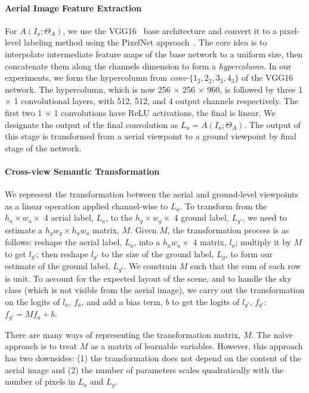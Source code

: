 \paragraph{Aerial Image Feature Extraction} For $A(I_a;\Theta_A)$, we
use the VGG16~\cite{simonyan2014very} base architecture and convert it to a 
pixel-level labeling method using the PixelNet approach~\cite{BansalChen16}.  
The core idea is to interpolate intermediate feature maps of the base
network to a uniform size, then concatenate them along the channels dimension 
to form a {\em hypercolumn}.  In our experiments, we form the hypercolumn from 
{\em conv-$\{1_2, 2_2, 3_3, 4_3\}$} of the VGG16
network.  The hypercolumn, which is now 256 $\times$ 256 $\times$ 960,
is followed by three 1 $\times$ 1 convolutional layers, with 512,
512, and 4 output channels respectively. The first two 1 $\times$ 1
convolutions have ReLU activations, the final is linear. We designate
the output of the final convolution as $L_a = A(I_a;\Theta_A)$. The
output of this stage is transformed from a aerial viewpoint to a
ground viewpoint by final stage of the network.
\label{sec:aerialnet}

\paragraph{Cross-view Semantic Transformation} We represent 
the transformation between the aerial and ground-level
viewpoints as a linear operation applied channel-wise to $L_a$.  To
transform from the $h_a \times w_a \times$ 4 aerial label, $L_a$, to
the $h_g \times w_g \times$ 4 ground label, $L_{g'}$, we need to
estimate a $h_gw_g \times h_a w_a$ matrix, $M$. Given $M$, the
transformation process is as follows: reshape the aerial label, $L_a$,
into a $h_aw_a \times $ 4 matrix, $l_a$; multiply it by $M$ to get
$l_{g'}$; then reshape $l_{g'}$ to the size of the ground label,
$L_g$, to form our estimate of the ground label, $L_{g'}$.  We
constrain $M$ such that the sum of each row is unit. To account for
the expected layout of the scene, and to handle the sky class (which
is not visible from the aerial image), we carry out the transformation
on the logits of $l_a$, $f_a$, and add a bias term, $b$ to get the
logits of $l_{g'}$, $f_{g'}$: $f_{g'} = M f_a + b$.

There are many ways of representing the transformation matrix, $M$.
The na\"{\i}ve approach is to treat $M$ as a matrix of learnable
variables. However, this approach has two downsides: (1) the
transformation does not depend on the content of the aerial image and
(2) the number of parameters scales quadratically with the number of
pixels in $L_a$ and $L_g$.  

